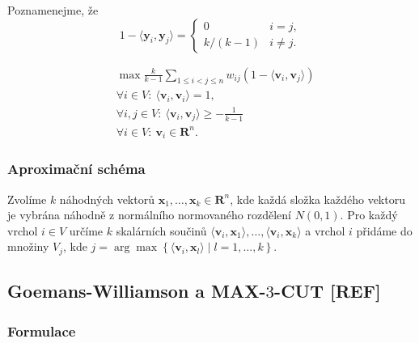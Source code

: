 \noindent Poznamenejme, že
$$
    1 - \langle \mathbf{y}_i, \mathbf{y}_j \rangle = 
    \begin{cases}
        0           & i = j, \\
        k / (k - 1) & i \neq j.
    \end{cases}
$$

\begin{equation}\tag{FJ-RELAX}
    \begin{split}
        &\max \frac{k}{k-1} \sum_{1 \leq i < j \leq n} w_{ij} (1 - \langle \mathbf{v}_i, \mathbf{v}_j \rangle) \\
        &\forall i \in V:\ \langle \mathbf{v}_i, \mathbf{v}_i \rangle = 1, \\
        &\forall i,j \in V:\ \langle \mathbf{v}_i, \mathbf{v}_j \rangle \geq -\frac{1}{k-1} \\
        &\forall i \in V:\ \mathbf{v}_i \in \mathbf{R}^n.
    \end{split}
    \label{eq:FJ-RELAX}
\end{equation}

\subsubsection*{Aproximační schéma}

Zvolíme $k$ náhodných vektorů $\mathbf{x}_1, \dots, \mathbf{x}_k \in \mathbf{R}^n$, kde každá složka každého vektoru je vybrána náhodně z normálního normovaného rozdělení $N(0,1)$. Pro každý vrchol $i \in V$ určíme $k$ skalárních součinů $\langle \mathbf{v}_i, \mathbf{x}_1 \rangle, \dots, \langle \mathbf{v}_i, \mathbf{x}_k \rangle$ a vrchol $i$ přidáme do množiny $V_j$, kde $j = \arg \max \left\{ \langle \mathbf{v}_i, \mathbf{x}_l \rangle \mid l = 1, \dots, k \right\}$.


\subsection{Goemans-Williamson a MAX-$3$-CUT \textbf{[REF]}}

\subsubsection*{Formulace}

